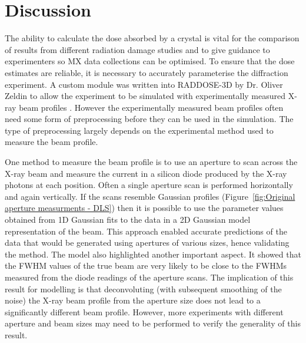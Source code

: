 \section{Discussion}
\label{sec:Discussion - Beam Chapter}
The ability to calculate the dose absorbed by a crystal is vital for the comparison of results from different radiation damage studies and to give guidance to experimenters so MX data collections can be optimised.
To ensure that the dose estimates are reliable, it is necessary to accurately parameterise the diffraction experiment.
A custom module was written into RADDOSE-3D by Dr. Oliver Zeldin to allow the experiment to be simulated with experimentally measured X-ray beam profiles \cite{zeldin2013dwd}.
However the experimentally measured beam profiles often need some form of preprocessing before they can be used in the simulation.
The type of preprocessing largely depends on the experimental method used to measure the beam profile.

One method to measure the beam profile is to use an aperture to scan across the X-ray beam and measure the current in a silicon diode produced by the X-ray photons at each position.
Often a single aperture scan is performed horizontally and again vertically.
If the scans resemble Gaussian profiles (Figure~\ref{fig:Original aperture measurments - DLS}) then it is possible to use the parameter values obtained from 1D Gaussian fits to the data in a 2D Gaussian model representation of the beam.
This approach enabled accurate predictions of the data that would be generated using apertures of various sizes, hence validating the method.
The model also highlighted another important aspect.
It showed that the FWHM values of the true beam are very likely to be close to the FWHMs measured from the diode readings of the aperture scans.
The implication of this result for modelling is that deconvoluting (with subsequent smoothing of the noise) the X-ray beam profile from the aperture size does not lead to a significantly different beam profile.
However, more experiments with different aperture and beam sizes may need to be performed to verify the generality of this result.

